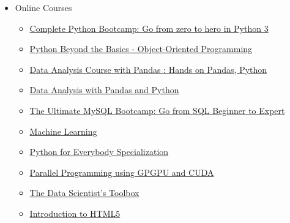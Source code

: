 \documentclass[10pt,a4paper,sans]{moderncv} %
\begin{document}
	
	
	\begin{itemize}
		
		\item[]  Online Courses
		
		\begin{multicols}{2}
			\begin{itemize}
				\item {} \href{https://www.udemy.com/course/complete-python-bootcamp/}{Complete Python Bootcamp: Go from zero to hero in Python 3} 
				
				\item {} \href{https://www.udemy.com/course/python-beyond-the-basics-object-oriented-programming/}{Python Beyond the Basics - Object-Oriented Programming}
				
				\item {} \href{https://www.udemy.com/course/data-analysis-with-pandas-python/}{Data Analysis Course with Pandas : Hands on Pandas, Python}
				
				\item {} \href{https://www.udemy.com/course/data-analysis-with-pandas/}{Data Analysis with Pandas and Python}
				
				\item {} \href{https://www.udemy.com/course/the-ultimate-mysql-bootcamp-go-from-sql-beginner-to-expert/}{The Ultimate MySQL Bootcamp: Go from SQL Beginner to Expert}
				
				\item {}  \href{https://www.coursera.org/learn/machine-learning}{Machine Learning}
				
				\item {} \href{https://www.coursera.org/specializations/python}{Python for Everybody Specialization}
				
				\item  {\large{}} \href{https://www.udemy.com/introduction-to-parallel-programming-using-gpgpu-and-cuda/learn/v4/overview}{Parallel Programming using GPGPU and CUDA}
				
				\item  {}  \href{https://www.coursera.org/learn/data-scientists-tools}{The Data Scientist's Toolbox}
				
				\item  {} \href{https://www.coursera.org/learn/html}{Introduction to HTML5} 
				

\end{itemize}
\end{multicols}
\end{itemize}
\end{document}
